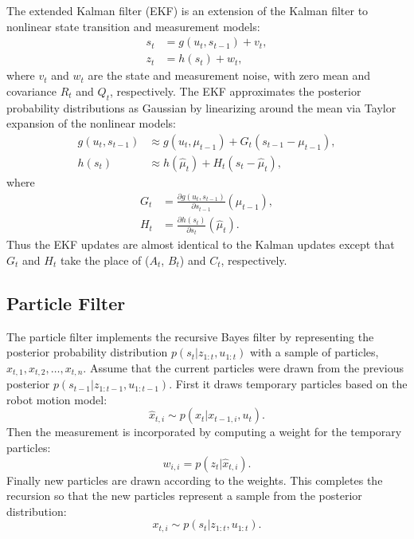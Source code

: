 \documentclass{article}
\begin{document}
The extended Kalman filter (EKF) is an extension of the Kalman filter to nonlinear state transition and measurement models:
\begin{align}
s_t &= g(u_t, s_{t-1}) + v_t, \\
z_t &= h(s_t) + w_t,
\end{align}
where $v_t$ and $w_t$ are the state and measurement noise, with zero mean and covariance $R_t$ and $Q_t$, respectively.  The EKF approximates the posterior probability distributions as Gaussian by linearizing around the mean via Taylor expansion of the nonlinear models:
\begin{align}
g(u_t, s_{t-1}) &\approx g(u_t, \mu_{t-1}) + G_t(s_{t-1} - \mu_{t-1}), \\
h(s_t) &\approx h(\hat{\mu}_t) + H_t(s_t - \hat{\mu}_t),
\end{align}
where
\begin{align}
G_t &= \frac{\partial g(u_t, s_{t-1})}{\partial s_{t-1}}(\mu_{t-1}), \\
H_t &= \frac{\partial h(s_t)}{\partial s_t}(\hat{\mu}_t).
\end{align}
Thus the EKF updates are almost identical to the Kalman updates except that $G_t$ and $H_t$ take the place of ($A_t$, $B_t$) and $C_t$, respectively.

\subsection{Particle Filter}

The particle filter implements the recursive Bayes filter by representing the posterior probability distribution $p(s_t | z_{1:t}, u_{1:t})$ with a sample of particles, $x_{t, 1}, x_{t, 2}, \ldots, x_{t, n}$.  Assume that the current particles were drawn from the previous posterior $p(s_{t-1} | z_{1:t-1}, u_{1:t-1})$.  First it draws temporary particles based on the robot motion model:
\begin{equation}
\hat{x}_{t, i} \sim p(x_t | x_{t-1, i}, u_t).
\end{equation}
Then the measurement is incorporated by computing a weight for the temporary particles:
\begin{equation}
w_{i, i} = p(z_t | \hat{x}_{t, i}).
\end{equation}
Finally new particles are drawn according to the weights.  This completes the recursion so that the new particles represent a sample from the posterior distribution:
\begin{equation}
x_{t, i} \sim p(s_t | z_{1:t}, u_{1:t}).
\end{equation}
\end{document}
